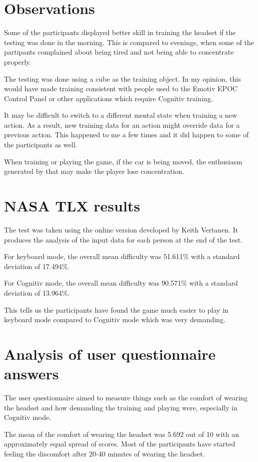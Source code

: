 \section{Observations}

Some of the participants displayed better skill in training the headset if the testing was done in the morning. This is compared to evenings, when some of the partipants complained about being tired and not being able to concentrate properly.

The testing was done using a cube as the training object. In my opinion, this would have made training consistent with people used to the Emotiv EPOC Control Panel or other applications which require Cognitiv training. 

It may be difficult to switch to a different mental state when training a new action. As a result, new training data for an action might override data for a previous action. This happened to me a few times and it did happen to some of the participants as well.

When training or playing the game, if the car is being moved, the enthusiasm generated by that may make the player lose concentration.

\section{NASA TLX results}
The test was taken using the \cite{nasatlx} online version developed by Keith Vertanen. It produces the analysis of the input data for each person at the end of the test. 

For keyboard mode, the overall mean difficulty was 51.611\% with a standard deviation of 17.494\%.

For Cognitiv mode, the overall mean difficulty was 90.571\% with a standard deviation of 13.964\%.

This tells us the participants have found the game much easier to play in keyboard mode compared to Cognitiv mode which was very demanding.

\section{Analysis of user questionnaire answers}
The user questionnaire aimed to measure things such as the comfort of wearing the headset and how demanding the training and playing were, especially in Cognitiv mode.

The mean of the comfort of wearing the headset was 5.692 out of 10 with an approximately equal spread of scores. Most of the participants have started feeling the discomfort after 20-40 minutes of wearing the headset. 

